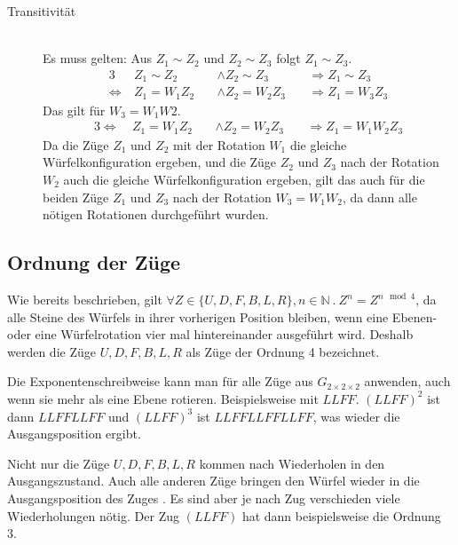 \documentclass[12pt,a4paper, usenames, dvipsnames]{article}
\newcommand{\Gtwo}{\ensuremath{G_{2\times 2\times 2}}}
\begin{document}
\begin{description}
\item [Transitivität] \ \\
Es muss gelten: Aus $Z_1 \sim Z_2$ und $Z_2 \sim Z_3$ folgt $Z_1 \sim Z_3$.
\begin{alignat*}{3}
& Z_1 \sim Z_2 && \wedge Z_2 \sim Z_3 && \Rightarrow Z_1 \sim Z_3 \\
\Leftrightarrow \ & Z_1 = W_1Z_2 \ && \wedge Z_2 = W_2Z_3 \ && \Rightarrow Z_1 = W_3Z_3
\end{alignat*}
Das gilt für $W_3=W_1W2$.
\begin{alignat*}{3}
\Leftrightarrow \ & Z_1 = W_1Z_2 \ && \wedge Z_2 = W_2Z_3 \ && \Rightarrow Z_1 = W_1W_2Z_3 
\end{alignat*}
Da die Züge $Z_1$ und $Z_2$ mit der Rotation $W_1$ die gleiche Würfelkonfiguration ergeben, und die Züge $Z_2$ und $Z_3$ nach der Rotation $W_2$ auch die gleiche Würfelkonfiguration ergeben, gilt das auch für die beiden Züge $Z_1$ und $Z_3$ nach der Rotation $W_3=W_1W_2$, da dann alle nötigen Rotationen durchgeführt wurden.

\end{description}
%
%
%
%
%
%
%
%
%
%
%
%
%
%
%
%
%
%
%
%
\subsection*{Ordnung der Züge}
Wie bereits beschrieben, gilt $\forall Z \in \{ U, D, F, B, L, R \}, n \in \mathbb{N} \ . \ Z^n=Z^{n \mod 4}$, da alle Steine des Würfels in ihrer vorherigen Position bleiben, wenn eine Ebenen- oder eine Würfelrotation vier mal hintereinander ausgeführt wird. Deshalb werden die Züge $U, D, F, B, L, R$ als Züge der Ordnung 4 bezeichnet. 


Die Exponentenschreibweise kann man für alle Züge aus $\Gtwo$ anwenden, auch wenn sie mehr als eine Ebene rotieren. Beispielsweise mit $LLFF$. $(LLFF)^2$ ist dann $LLFFLLFF$ und $(LLFF)^3$ ist $LLFFLLFFLLFF$, was wieder die Ausgangsposition ergibt. 


Nicht nur die Züge $U, D, F, B, L, R$ kommen nach Wiederholen in den Ausgangszustand. Auch alle anderen Züge bringen den Würfel wieder in die Ausgangsposition des Zuges \cite{TD}. Es sind aber je nach Zug verschieden viele Wiederholungen nötig. Der Zug $(LLFF)$ hat dann beispielsweise die Ordnung 3.
\end{document}
